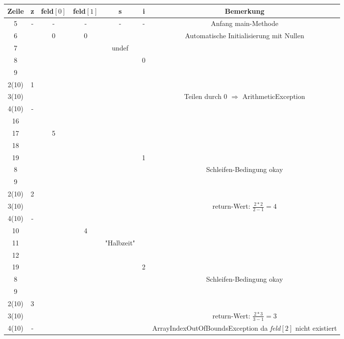 \documentclass{scrartcl}
\begin{document}
\begin{center}
\begin{tabular}{ccccccc} %
	\toprule
	Zeile	& z	& feld$\left[0\right]$	& feld$\left[1\right]$	& s				& i	& Bemerkung\\
	\midrule
	5		& -	& -						& -						& -				& -	& Anfang main-Methode\\
	6		& 	& 0						& 0						& 				& 	& Automatische Initialisierung mit Nullen\\
	7		&	&						&						& undef			&	& \\
	8		&	&						&						&				& 0	& \\
	9		&	&						&						&				&	& \\ %
	\midrule
	2(10)	& 1	&						&						&				&	& \\
	3(10)	&	&						&						&				&	& Teilen durch 0 $\Rightarrow$ ArithmeticException\\
	4(10)	& -	&						&						&				&	& \\
	\midrule
	16		&	&						&						&				&	& \\
	17		&	& 5						&						&				&	& \\
	18		&	&						&						&				&	& \\
	19		&	&						&						&				& 1	& \\
	8		&	&						&						&				&	& Schleifen-Bedingung okay\\
	9		&	&						&						&				&	& \\ %
	\midrule
	2(10)	& 2	&						&						&				&	& \\
	3(10)	&	&						&						&				&	& return-Wert: $\frac{2*2}{2-1}=4$\\
	4(10)	& -	&						&						&				&	& \\
	\midrule
	10		& 	&						& 4						&				&	& \\
	11		&	&						&						& "Halbzeit"	&	& \\
	12		&	&						&						&				&	& \\
	19		&	&						&						&				& 2	& \\
	8		&	&						&						&				&	& Schleifen-Bedingung okay\\
	9		&	&						&						&				&	& \\ %
	\midrule
	2(10)	& 3	&						&						&				&	& \\
	3(10)	&	&						&						&				&	& return-Wert: $\frac{2*3}{3-1}=3$\\
	4(10)	& -	&						&						&				&	& \multirow{2}{4cm}{ArrayIndexOutOfBoundsException da \emph{feld$\left[2\right]$} nicht existiert}\\

\end{tabular}
\end{center}
\end{document}
